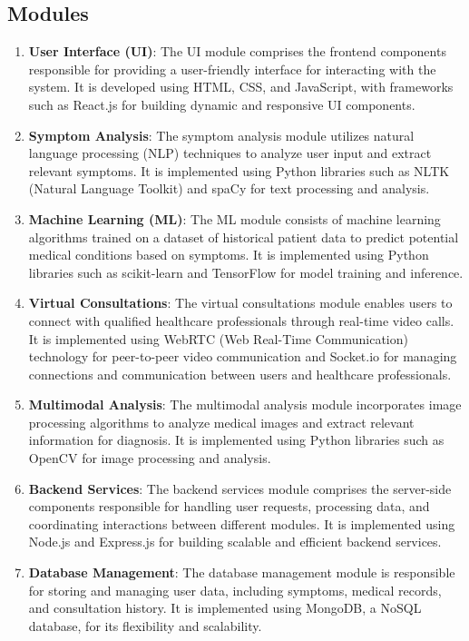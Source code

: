 \documentclass[onecolumn]{article}
\begin{document}
\subsection{Modules}
\begin{enumerate}
\item \textbf{User Interface (UI)}: The UI module comprises the frontend components responsible for providing a user-friendly interface for interacting with the system. It is developed using HTML, CSS, and JavaScript, with frameworks such as React.js for building dynamic and responsive UI components.
\item \textbf{Symptom Analysis}: The symptom analysis module utilizes natural language processing (NLP) techniques to analyze user input and extract relevant symptoms. It is implemented using Python libraries such as NLTK (Natural Language Toolkit) and spaCy for text processing and analysis.
\item \textbf{Machine Learning (ML)}: The ML module consists of machine learning algorithms trained on a dataset of historical patient data to predict potential medical conditions based on symptoms. It is implemented using Python libraries such as scikit-learn and TensorFlow for model training and inference.
\item \textbf{Virtual Consultations}: The virtual consultations module enables users to connect with qualified healthcare professionals through real-time video calls. It is implemented using WebRTC (Web Real-Time Communication) technology for peer-to-peer video communication and Socket.io for managing connections and communication between users and healthcare professionals.
\item \textbf{Multimodal Analysis}: The multimodal analysis module incorporates image processing algorithms to analyze medical images and extract relevant information for diagnosis. It is implemented using Python libraries such as OpenCV for image processing and analysis.
\item \textbf{Backend Services}: The backend services module comprises the server-side components responsible for handling user requests, processing data, and coordinating interactions between different modules. It is implemented using Node.js and Express.js for building scalable and efficient backend services.
\item \textbf{Database Management}: The database management module is responsible for storing and managing user data, including symptoms, medical records, and consultation history. It is implemented using MongoDB, a NoSQL database, for its flexibility and scalability.
\end{enumerate}
\end{document}
